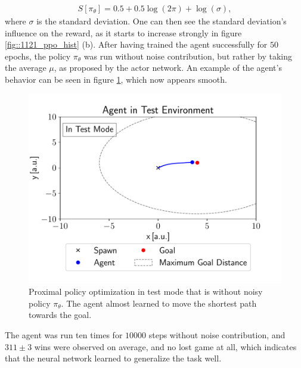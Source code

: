 \begin{align}
S[\pi_\theta] = 0.5 + 0.5\log(2\pi)+\log(\sigma),
\end{align}
where $\sigma$ is the standard deviation. One can then see the standard deviation's influence on the reward, as it starts to increase strongly in figure \ref{fig::1121_ppo_hist} (b). After having trained the agent successfully for $50$ epochs, the policy $\pi_\theta$ was run without noise contribution, but rather by taking the average $\mu$, as proposed by the actor network. An example of the agent's behavior can be seen in figure \ref{fig::1121_ppo_test}, which now appears smooth. 
\begin{figure}[h!]
	\centering
	\includegraphics[scale=.45]{chapters/11_autonomous_walking_experiments/img/test_mode.pdf}
	\caption{Proximal policy optimization in test mode that is without noisy policy $\pi_\theta$. The agent almost learned to move the shortest path towards the goal.}	
	\label{fig::1121_ppo_test}
\end{figure}
The agent was run ten times for $10000$ steps without noise contribution, and $311\pm3$ wins were observed on average, and no lost game at all, which indicates that the neural network learned to generalize the task well.
